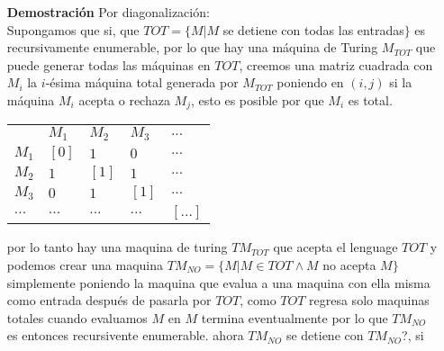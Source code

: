 \documentclass{article}
\begin{document}
\begin{enumerate}
\item[\bf{Demostración}] Por diagonalización:\\

Supongamos que si, que $TOT = \{ M | M $ se detiene con todas las entradas$ \}$ es recursivamente enumerable, por lo que hay una máquina de Turing $M_{TOT}$ que puede generar todas las máquinas en $TOT$, creemos una matriz cuadrada con $M_i$ la $i$-ésima máquina total generada por $M_{TOT}$ poniendo en $(i,j)$ si la máquina $M_i$ acepta o rechaza $M_j$, esto es posible por que $M_i$ es total.

\begin{tabular}{|l||l|l|l|l|}
  \hline
          & $M_1$ & $M_2$ & $M_3$ & $...$ \\
   $M_1$  & $[0]$   & $1$   & $0$   & $...$ \\
   $M_2$  & $1$   & $[1]$   & $1$   & $...$ \\
   $M_3$  & $0$   & $1$   & $[1]$   & $...$ \\
   $...$  & $...$ & $...$ & $...$ & $[...]$ \\ 
  \hline  
\end{tabular}



 por lo tanto hay una maquina de turing $TM_{TOT}$ que acepta el lenguage $TOT$ y podemos crear una maquina $TM_{NO} = \{M | M \in TOT \wedge M$ no acepta $M \}$ simplemente poniendo la maquina que evalua a una maquina con ella misma como entrada después de pasarla por $TOT$, como $TOT$ regresa solo maquinas totales cuando evaluamos $M$ en $M$ termina eventualmente por lo que $TM_{NO}$ es entonces recursivente enumerable.
ahora $TM_{NO}$ se detiene con $TM_{NO}$?,  si 

 

\end{enumerate}
\end{document}
